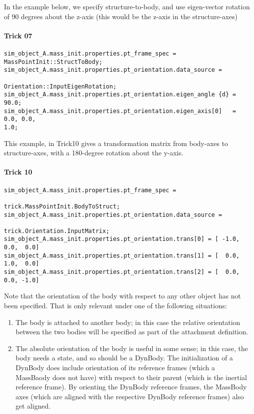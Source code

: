In the example below, we specify structure-to-body, and use eigen-vector
rotation of 90 degrees about the z-axis (this would be the z-axis in the
structure-axes)

\paragraph{Trick 07}

  \begin{verbatim}
sim_object_A.mass_init.properties.pt_frame_spec =
MassPointInit::StructToBody;
sim_object_A.mass_init.properties.pt_orientation.data_source =
                                        Orientation::InputEigenRotation;
sim_object_A.mass_init.properties.pt_orientation.eigen_angle {d} = 90.0;
sim_object_A.mass_init.properties.pt_orientation.eigen_axis[0]   = 0.0, 0.0,
1.0;
\end{verbatim}

This example, in Trick10 gives a transformation matrix from body-axes to
structure-axes, with a 180-degree rotation about the y-axis.
\paragraph{Trick 10}

  \begin{verbatim}
sim_object_A.mass_init.properties.pt_frame_spec =
                                         trick.MassPointInit.BodyToStruct;
sim_object_A.mass_init.properties.pt_orientation.data_source =
                                                 trick.Orientation.InputMatrix;
sim_object_A.mass_init.properties.pt_orientation.trans[0] = [ -1.0,  0.0,  0.0]
sim_object_A.mass_init.properties.pt_orientation.trans[1] = [  0.0,  1.0,  0.0]
sim_object_A.mass_init.properties.pt_orientation.trans[2] = [  0.0,  0.0, -1.0]
\end{verbatim}

Note that the orientation of the body with respect to any other object has not
been specified.  That is only relevant under one of the following situations:
\begin{enumerate}
 \item The body is attached to another body; in this case the relative
 orientation between the two bodies will be specified as part of the
 attachment definition.
 \item The absolute orientation of the body is useful in some sense; in this
 case, the body needs a state, and so should be a DynBody.  The initialization
 of a DynBody does include orientation of its reference frames (which a
 MassBaody does not have) with respect to their parent (which is the inertial
 reference frame).  By orienting the DynBody reference frames, the MassBody
 axes (which are aligned with the respective DynBody reference frames) also
 get aligned.
\end{enumerate}

